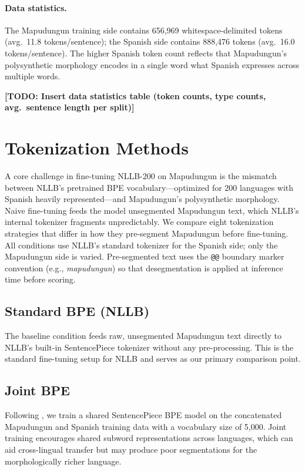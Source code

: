 \documentclass[11pt]{article}
\newcommand{\todo}[1]{\textbf{[TODO: #1]}}
\begin{document}
\paragraph{Data statistics.} The Mapudungun training side contains 656,969 whitespace-delimited tokens (avg.\ 11.8 tokens/sentence); the Spanish side contains 888,476 tokens (avg.\ 16.0 tokens/sentence). The higher Spanish token count reflects that Mapudungun's polysynthetic morphology encodes in a single word what Spanish expresses across multiple words.

\todo{Insert data statistics table (token counts, type counts, avg.\ sentence length per split)}

\section{Tokenization Methods}
\label{sec:tokenization}

A core challenge in fine-tuning NLLB-200 on Mapudungun is the mismatch between NLLB's pretrained BPE vocabulary—optimized for 200 languages with Spanish heavily represented—and Mapudungun's polysynthetic morphology. Naive fine-tuning feeds the model unsegmented Mapudungun text, which NLLB's internal tokenizer fragments unpredictably. We compare eight tokenization strategies that differ in how they pre-segment Mapudungun before fine-tuning. All conditions use NLLB's standard tokenizer for the Spanish side; only the Mapudungun side is varied. Pre-segmented text uses the \texttt{@@} boundary marker convention (e.g., \textit{mapu\@@\@ dun\@@\@ gun}) so that desegmentation is applied at inference time before scoring.

\subsection{Standard BPE (NLLB)}

The baseline condition feeds raw, unsegmented Mapudungun text directly to NLLB's built-in SentencePiece tokenizer without any pre-processing. This is the standard fine-tuning setup for NLLB and serves as our primary comparison point.

\subsection{Joint BPE}

Following \citet{duan2020avenue}, we train a shared SentencePiece BPE model \cite{kudo2018sentencepiece} on the concatenated Mapudungun and Spanish training data with a vocabulary size of 5,000. Joint training encourages shared subword representations across languages, which can aid cross-lingual transfer but may produce poor segmentations for the morphologically richer language.
\end{document}
